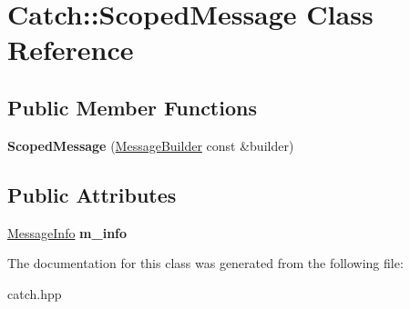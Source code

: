 \hypertarget{class_catch_1_1_scoped_message}{}\section{Catch\+:\+:Scoped\+Message Class Reference}
\label{class_catch_1_1_scoped_message}
\subsection*{Public Member Functions}
\begin{DoxyCompactItemize}
\item 
\mbox{\label{class_catch_1_1_scoped_message_a5cc59f0f2ebe840e6607f83004d49a17}} 
{\bfseries Scoped\+Message} (\mbox{\hyperlink{struct_catch_1_1_message_builder}{Message\+Builder}} const \&builder)
\end{DoxyCompactItemize}
\subsection*{Public Attributes}
\begin{DoxyCompactItemize}
\item 
\mbox{\label{class_catch_1_1_scoped_message_ae6e1476f389cc6e1586f033b3747b27b}} 
\mbox{\hyperlink{struct_catch_1_1_message_info}{Message\+Info}} {\bfseries m\+\_\+info}
\end{DoxyCompactItemize}


The documentation for this class was generated from the following file\+:\begin{DoxyCompactItemize}
\item 
catch.\+hpp\end{DoxyCompactItemize}
